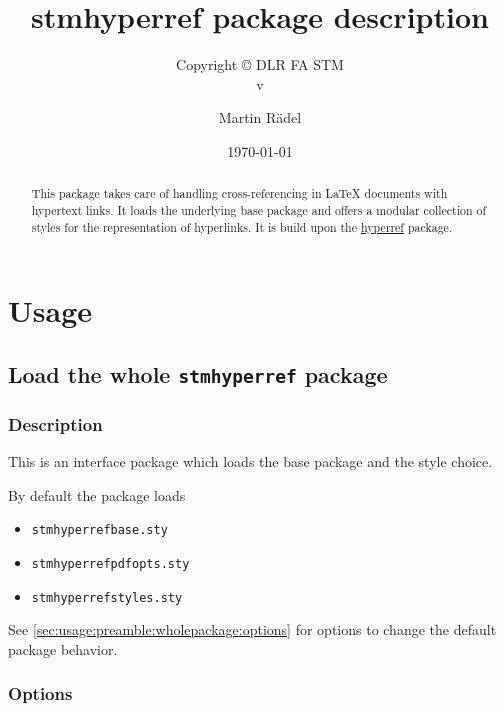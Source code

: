 \documentclass[%
  type=article,%
  layout=koma,%
  conditionallox=true,%
  conditionalloxnewpage=false,%
  date=true,%
  index=true,%
  listings=true%
]{stmtext}
\author{Martin R\"{a}del}
\title{stmhyperref package description}
\subtitle{Copyright \copyright{} \the\year{} DLR FA STM\\v\formatdate[versiondatestyle]{\DTMToday}}
\date{\today}
\begin{document}
\maketitle

\begin{abstract}
This package takes care of handling cross-referencing in \LaTeX{} documents with hypertext links. It loads the underlying base package and offers a modular collection of styles for the representation of hyperlinks. It is build upon the \href{https://ctan.org/pkg/hyperref}{hyperref} package.
\end{abstract}

\tableofcontents

\conditionallistoffigures  %
\conditionallistoftables   %
\conditionallistoflistings %

\section{Usage}%

\subsection{Load the whole \protect\texttt{stmhyperref} package}
\label{sec:usage:preamble:wholepackage}

\subsubsection{Description}
\label{sec:usage:preamble:wholepackage:description}

This is an interface package which loads the base package and the style choice.

By default the package loads

\begin{itemize}[noitemsep]
  \item \verb+stmhyperrefbase.sty+
  \item \verb+stmhyperrefpdfopts.sty+
  \item \verb+stmhyperrefstyles.sty+
\end{itemize}

See \autoref{sec:usage:preamble:wholepackage:options} for options to change the default package behavior.

\subsubsection{Options}
\label{sec:usage:preamble:wholepackage:options}
\end{document}
